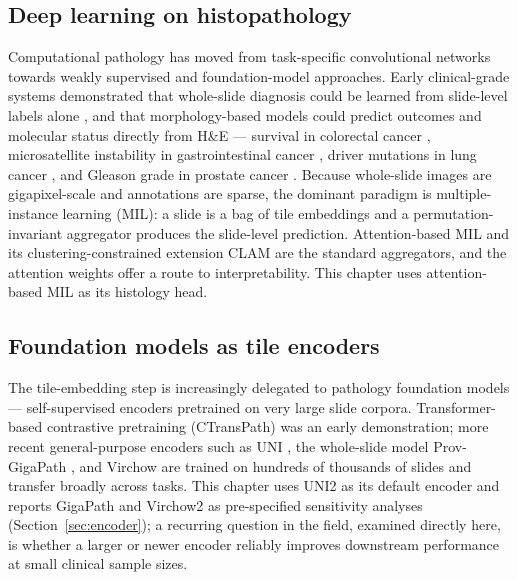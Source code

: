 \subsection{Deep learning on histopathology}
Computational pathology has moved from task-specific convolutional networks
towards weakly supervised and foundation-model approaches. Early clinical-grade
systems demonstrated that whole-slide diagnosis could be learned from slide-level
labels alone \cite{campanella2019}, and that morphology-based models could
predict outcomes and molecular status directly from H\&E --- survival in
colorectal cancer \cite{kather2019survival}, microsatellite instability in
gastrointestinal cancer \cite{kather2019msi}, driver mutations in lung cancer
\cite{coudray2018lung}, and Gleason grade in prostate cancer
\cite{bulten2020gleason}. Because whole-slide images are gigapixel-scale and
annotations are sparse, the dominant paradigm is multiple-instance learning
(MIL): a slide is a bag of tile embeddings and a permutation-invariant
aggregator produces the slide-level prediction. Attention-based MIL
\cite{ilse2018abmil} and its clustering-constrained extension CLAM
\cite{lu2021clam} are the standard aggregators, and the attention weights offer
a route to interpretability. This chapter uses attention-based MIL as its
histology head.

\subsection{Foundation models as tile encoders}
The tile-embedding step is increasingly delegated to pathology foundation
models --- self-supervised encoders pretrained on very large slide corpora.
Transformer-based contrastive pretraining (CTransPath) \cite{wang2022ctranspath}
was an early demonstration; more recent general-purpose encoders such as UNI
\cite{chen2024uni}, the whole-slide model Prov-GigaPath \cite{xu2024gigapath},
and Virchow \cite{vorontsov2024virchow} are trained on hundreds of thousands of
slides and transfer broadly across tasks. This chapter uses UNI2 as its default
encoder and reports GigaPath and Virchow2 as pre-specified sensitivity analyses
(Section~\ref{sec:encoder}); a recurring question in the field, examined
directly here, is whether a larger or newer encoder reliably improves downstream
performance at small clinical sample sizes.

